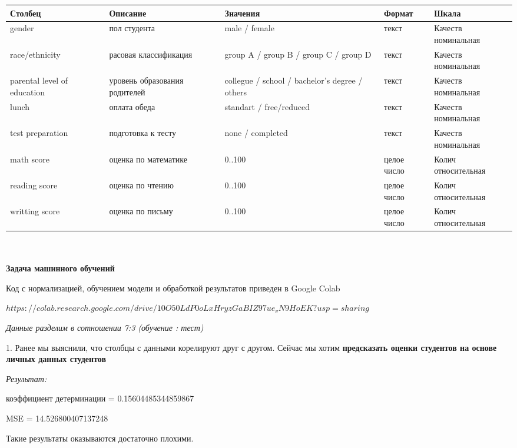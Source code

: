 \documentclass[12pt,a4paper]{article}
\begin{document}
\begin{tabular}{ | p{100pt} | p{100pt} | p{100pt} | p{40pt} | p{60pt} |}
\hline
Столбец & Описание & Значения & Формат & Шкала  \\ \hline
gender & пол студента & male / female & текст & Качеств номинальная \\ \hline
race/ethnicity & расовая классификация & group A / group B / group C / group D & текст & Качеств номинальная  \\ \hline
parental level of education & уровень образования родителей & collegue / school / bachelor's degree / others  & текст & Качеств номинальная  \\ \hline
lunch & оплата обеда & standart / free/reduced & текст & Качеств номинальная  \\ \hline
test preparation & подготовка к тесту & none / completed & текст & Качеств номинальная  \\ \hline
math score & оценка по математике & 0..100 & целое число & Колич относительная  \\ \hline
reading score & оценка по чтению & 0..100 & целое число & Колич относительная  \\ \hline
writting score & оценка по письму & 0..100 & целое число & Колич относительная  \\ \hline
\end{tabular}
\\
\\

\large \textbf{Задача машинного обучений}

Код с нормализацией, обучением модели и обработкой результатов приведен в Google Colab


\href{https://colab.research.google.com/drive/10O50LdP0oLxHryzGaBIZ97ue_vN9HoEK?usp=sharing}{$https://colab.research.google.com/drive/10O50LdP0oLxHryzGaBIZ97ue_vN9HoEK?usp=sharing$}


\textit{Данные разделим в сотношении 7:3 (обучение : тест)}

1. Ранее мы выяснили, что столбцы с данными корелируют друг с другом. Сейчас мы хотим \textbf{предсказать оценки студентов на основе личных данных студентов}

\textit{Результат: } 

коэффициент детерминации = 0.15604485344859867

MSE = 14.526800407137248

Такие результаты оказываются достаточно плохими. 
\end{document}
